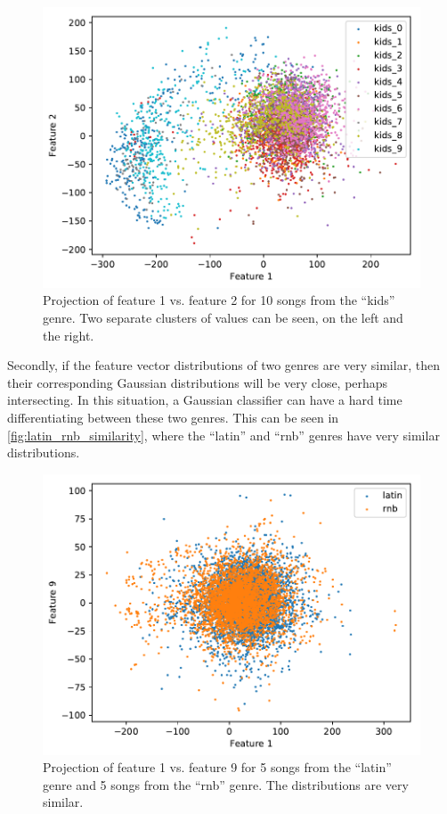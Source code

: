 \documentclass[a4paper,titlepage]{article}
\begin{document}
	\begin{figure}[!htb]
		\centering
		\includegraphics[width=\columnwidth]{plots/kids_cluster.pdf}
		\caption
		{Projection of feature 1 vs. feature 2 for 10 songs from the ``kids'' genre. Two separate clusters of values can be seen, on the left and the right.}
		\label{fig:kids_cluster}
	\end{figure}
	
	Secondly, if the feature vector distributions of two genres are very similar, then their corresponding Gaussian distributions will be very close, perhaps intersecting. In this situation, a Gaussian classifier can have a hard time differentiating between these two genres. This can be seen in \autoref{fig:latin_rnb_similarity}, where the ``latin'' and ``rnb'' genres have very similar distributions.
	
	\begin{figure}[!htb]
		\centering
		\includegraphics[width=\columnwidth]{plots/latin_rnb_similarity.pdf}
		\caption
		{Projection of feature 1 vs. feature 9 for 5 songs from the ``latin'' genre and 5 songs from the ``rnb'' genre. The distributions are very similar.}
		\label{fig:latin_rnb_similarity}
	\end{figure}
	
\end{document}
